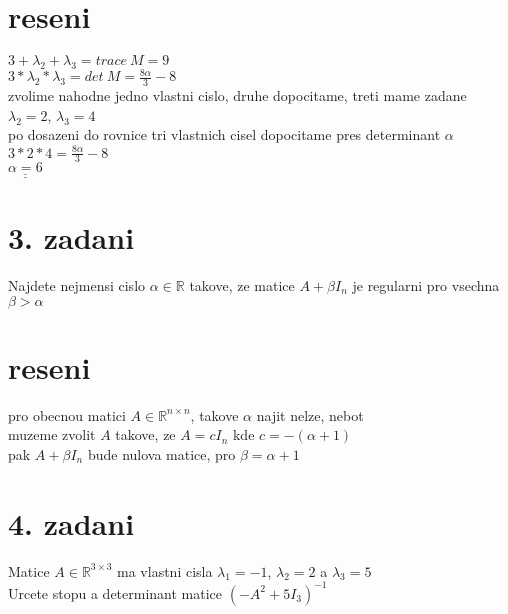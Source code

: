 \documentclass[a4paper]{article}
\def\doubleunderline#1{\underline{\underline{#1}}}
\begin{document}
\section*{reseni}
$3+\lambda_2+\lambda_3=trace~M=9$\\
$3*\lambda_2*\lambda_3=det~M=\frac{8\alpha}{3}-8$\\
zvolime nahodne jedno vlastni cislo, druhe dopocitame, treti mame zadane\\
$\lambda_2=2$, $\lambda_3=4$\\
po dosazeni do rovnice tri vlastnich cisel dopocitame pres determinant $\alpha$\\
$3*2*4=\frac{8\alpha}{3}-8$\\
$\doubleunderline{\alpha=6}$\\













\section*{3. zadani}
Najdete nejmensi cislo $\alpha \in \mathbb{R}$ takove, ze matice 
$A+\beta I_n$ je regularni pro vsechna $\beta > \alpha$\\

\section*{reseni}
pro obecnou matici $A\in\mathbb{R}^{n\times n}$,
takove $\alpha$ najit nelze, nebot\\
muzeme zvolit $A$ takove, ze $A = cI_n$ kde $c=-(\alpha+1)$\\
pak $A + \beta I_n$ bude nulova matice, pro $\beta=\alpha+1$













\section*{4. zadani}
Matice $A\in\mathbb{R}^{3\times3}$ ma vlastni cisla
$\lambda_1=-1$, $\lambda_2=2$ a $\lambda_3=5$\\
Urcete stopu a determinant matice $(-A^2+5I_3)^{-1}$ 
\end{document}
